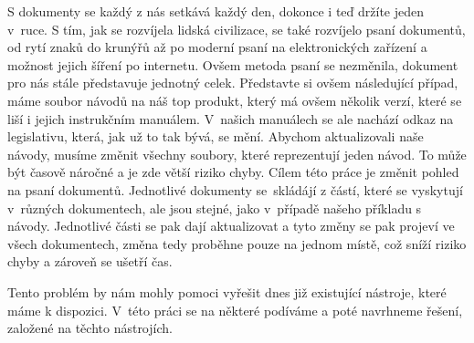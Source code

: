 S dokumenty se každý z nás setkává každý den, dokonce i teď držíte jeden v~ruce. S tím, jak se rozvíjela lidská civilizace,
se také rozvíjelo psaní dokumentů, od rytí znaků do krunýřů až po moderní psaní na elektronických zařízení a možnost jejich šíření po internetu.
Ovšem metoda psaní se nezměnila, dokument pro nás stále představuje jednotný celek. Představte si ovšem \linebreak následující případ, máme soubor návodů na náš top
produkt, který má ovšem několik verzí, které se liší i jejich instrukčním manuálem. V~našich manuálech se ale nachází odkaz na legislativu, která, jak už to tak
bývá, se mění. Abychom aktualizovali naše návody, musíme změnit všechny soubory, které reprezentují jeden návod. To může být časově náročné a je zde větší riziko
chyby. Cílem této práce je změnit pohled na psaní dokumentů. Jednotlivé dokumenty se~skládájí z částí, které se vyskytují v~různých dokumentech, ale jsou stejné,
jako v~případě našeho příkladu s návody. Jednotlivé části se pak dají aktualizovat a tyto změny se pak projeví ve všech dokumentech, změna tedy proběhne
pouze na jednom místě, což sníží riziko chyby a zároveň se ušetří čas.

Tento problém by nám mohly pomoci vyřešit dnes již existující nástroje, které máme k dispozici. V~této práci se na některé podíváme a poté navrhneme řešení, založené
na těchto nástrojích.